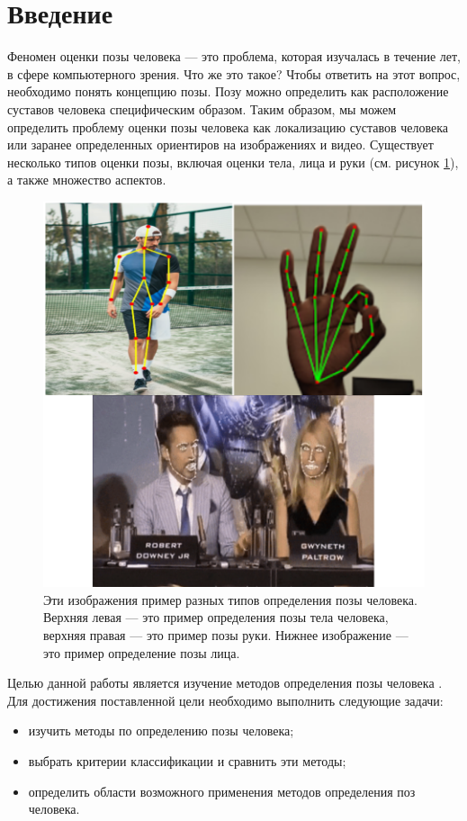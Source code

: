 
\chapter*{Введение}


Феномен оценки позы человека --- это проблема, которая изучалась в течение лет, в сфере компьютерного зрения. Что же это такое? Чтобы ответить на этот вопрос, необходимо понять концепцию позы. Позу можно определить как расположение суставов человека специфическим образом. Таким образом, мы можем определить проблему оценки позы человека как локализацию суставов человека или заранее определенных ориентиров на изображениях и видео. Существует несколько типов оценки позы, включая оценки тела, лица и руки (см. рисунок \ref{img:human,hand,face}), а также множество аспектов.

\begin{figure}[ht!]
	\centering
	\includegraphics[width=0.96\linewidth]{assets/thefirst.png}
	\caption{Эти изображения пример разных типов определения позы человека. Верхняя левая --- это пример определения позы тела человека, верхняя правая --- это пример позы руки. Нижнее изображение --- это пример определение позы лица.}
	\label{img:human,hand,face}
\end{figure}


Целью данной работы является изучение методов определения позы человека \cite{guide-hpe}. Для достижения поставленной цели необходимо выполнить следующие задачи:
\begin{itemize}
	\item изучить методы по определению позы человека;
	\item выбрать критерии классификации и сравнить эти методы;
	\item определить области возможного применения методов определения поз человека.
\end{itemize}